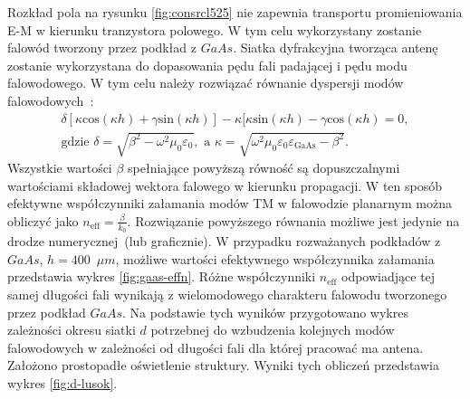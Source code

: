 Rozkład pola na rysunku \ref{fig:consrcl525} nie zapewnia transportu promieniowania E-M w kierunku tranzystora polowego. W tym celu wykorzystany zostanie falowód tworzony przez podkład z $GaAs$. Siatka dyfrakcyjna tworząca antenę zostanie wykorzystana do dopasowania pędu fali padającej i pędu modu falowodowego. W tym celu należy rozwiązać równanie dyspersji modów falowodowych~\cite{petykiewicz1989podstawy}:
\begin{equation}
	\begin{gathered}
	\delta [ \kappa \textrm{cos}(\kappa h) + \gamma\textrm{sin}(\kappa h) ] - \kappa [ \kappa \textrm{sin}(\kappa h) - \gamma \textrm{cos}(\kappa h) = 0,\\
	\textrm{gdzie }\delta=\sqrt{\beta^2-\omega^2\mu_0\varepsilon_0},\textrm{ a }\kappa=\sqrt{\omega^2\mu_0 \varepsilon_0 \varepsilon_{\textrm{GaAs}}-\beta^2}.
	\end{gathered}
\end{equation}
Wszystkie wartości $\beta$ spełniające powyższą równość są dopuszczalnymi wartościami składowej wektora falowego w kierunku propagacji. W ten sposób efektywne współczynniki załamania modów TM w falowodzie planarnym można obliczyć jako $n_{\textrm{eff}}=\frac{\beta}{k_0}$. Rozwiązanie powyższego równania możliwe jest jedynie na drodze numerycznej~(lub graficznie). W przypadku rozważanych podkładów z $GaAs$, $h=400$~$\mu m$, możliwe wartości efektywnego współczynnika załamania przedstawia wykres \ref{fig:gaas-effn}. Różne współczynniki $n_{\textrm{eff}}$ odpowiadjące tej samej długości fali wynikają z wielomodowego charakteru falowodu tworzonego przez podkład $GaAs$. Na podstawie tych wyników przygotowano wykres zależności okresu siatki $d$ potrzebnej do wzbudzenia kolejnych modów falowodowych w zależności od długości fali dla której pracować ma antena. Założono prostopadłe oświetlenie struktury. Wyniki tych obliczeń przedstawia wykres \ref{fig:d-lusok}.

